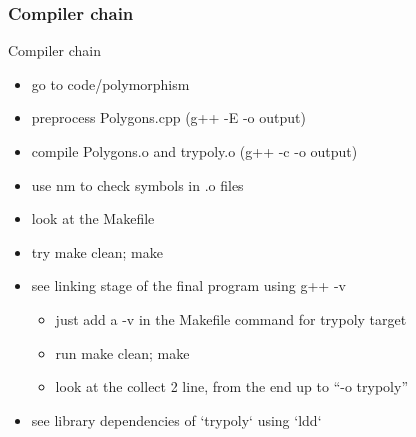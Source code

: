 \begin{frame}[fragile]
  \frametitle{Compiler chain}
  \begin{exercise}{Compiler chain}
    \begin{itemize}
    \item go to code/polymorphism
    \item preprocess Polygons.cpp (g++ -E -o output)
    \item compile Polygons.o and trypoly.o (g++ -c -o output)
    \item use nm to check symbols in .o files
    \item look at the Makefile
    \item try make clean; make
    \item see linking stage of the final program using g++ -v
      \begin{itemize}
      \item just add a -v in the Makefile command for trypoly target
      \item run make clean; make
      \item look at the collect 2 line, from the end up to ``-o trypoly''
      \end{itemize}
    \item see library dependencies of `trypoly` using `ldd`
    \end{itemize}
  \end{exercise}
\end{frame}

